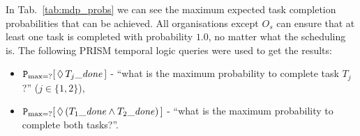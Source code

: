 \documentclass{llncs}
\begin{document}
In Tab.~\ref{tab:mdp_probs} we can see the maximum expected task completion probabilities that can be achieved. All organisations except $O_s$ can ensure that at least one task is completed with probability $1.0$, no matter what the scheduling is. The following PRISM temporal logic queries were used to get the results:
\begin{itemize}
 \item ${\tt P}_{\max=?}[\,\Diamond\,T_{j} \mathit{\_done}\,]$ -
``what is the maximum probability to complete  task $T_j$?'' ($j\in\{1,2\}$),
 \item ${\tt P}_{\max=?}[\,\Diamond\,(T_{1}\mathit{\_done} \wedge T_2 \mathit{\_done})\,]$ -
``what is the maximum probability to complete  both tasks?''. %
\end{itemize}
\end{document}
